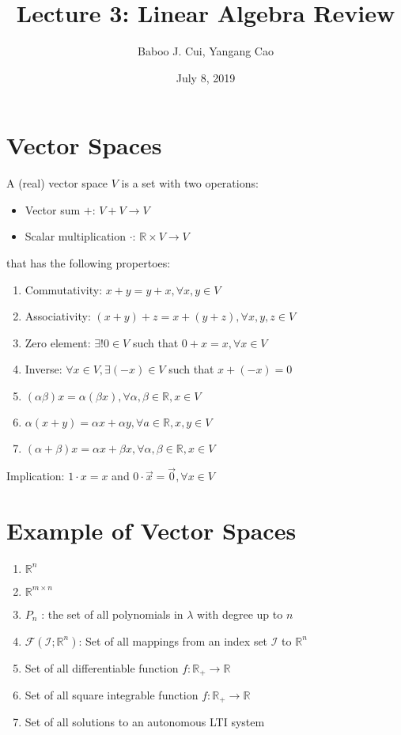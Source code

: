 \documentclass[10pt,a4paper,oneside]{article}
\date{July 8, 2019}
\author{Baboo J. Cui, Yangang Cao}
\title{Lecture 3: Linear Algebra Review}
\begin{document}
\maketitle
\tableofcontents
\newpage
\section{Vector Spaces}
A (real) vector space $V$ is a set with two operations:
\begin{itemize}
\item Vector sum $+$: $V +V\rightarrow V$
\item Scalar multiplication $\cdot$: $\mathbb{R}\times V\rightarrow V$
\end{itemize}
that has the following propertoes:
\begin{enumerate}
\item Commutativity: $x+y=y+x, \forall x, y \in V$
\item Associativity: $(x+y)+z=x+(y+z), \forall x, y, z \in V$
\item Zero element: $\exists !0 \in V$ such that $0+x=x, \forall x \in V$
\item Inverse: $\forall x \in V, \exists(-x) \in V$ such that $x+(-x)=0$
\item $(\alpha \beta) x=\alpha(\beta x), \forall \alpha, \beta \in \mathbb{R}, x \in V$
\item $\alpha(x+y)=\alpha x+\alpha y, \forall a \in \mathbb{R}, x, y \in V$
\item $(\alpha+\beta) x=\alpha x+\beta x, \forall \alpha, \beta \in \mathbb{R}, x \in V$
\end{enumerate}
Implication: $1 \cdot x=x$ and $0 \cdot \vec{x}=\vec{0}, \forall x \in V$
\section{Example of Vector Spaces}
\begin{enumerate}
\item $\mathbb{R}^n$
\item $\mathbb{R}^{m \times n}$
\item $P_{n}$ : the set of all polynomials in $\lambda$ with degree up to $n$
\item $\mathcal{F}\left(\mathcal{I} ; \mathbb{R}^{n}\right)$: Set of all mappings from an index set $\mathcal{I}$ to $\mathbb{R}^{n}$
\item Set of all differentiable function $f : \mathbb{R}_{+} \rightarrow \mathbb{R}$
\item Set of all square integrable function $f : \mathbb{R}_{+} \rightarrow \mathbb{R}$
\item Set of all solutions to an autonomous LTI system
\end{enumerate}
\end{document}
